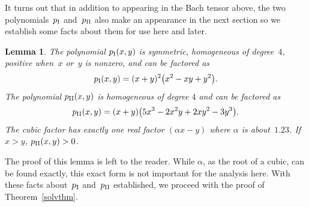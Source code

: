 \documentclass[10pt,a4paper]{amsart}
\numberwithin{equation}{section}
\newtheorem{Lemma}[Theorem]{Lemma}
\begin{document}
It turns out that in addition to appearing in the Bach tensor above, the two polynomials~$p_{\rm I}$ and~$p_{\rm II}$ also make an appearance in the next section so we establish some facts about them for use here and later.

\begin{Lemma}The polynomial $p_{\rm I}(x,y)$ is symmetric, homogeneous of degree~$4$, positive when~$x$ or~$y$ is nonzero, and can be factored as
\[
p_{\rm I}(x, y) = (x+y)^2\big(x^2 - xy + y^2\big).
\]
The polynomial $p_{\rm II}(x,y)$ is homogeneous of degree $4$ and can be factored as
\[
p_{\rm II}(x, y) = (x+y)\big(5x^3 - 2x^2y + 2xy^2 - 3y^3\big).
\]
The cubic factor has exactly one real factor $(\alpha x - y)$ where $\alpha$ is about~$1.23$. If $x > y$, $p_{\rm II}(x, y) > 0$.
\end{Lemma}

The proof of this lemma is left to the reader. While $\alpha$, as the root of a cubic, can be found exactly, this exact form is not important for the analysis here. With these facts about~$p_{\rm I}$ and~$p_{\rm II}$ established, we proceed with the proof of Theorem~\ref{solvthm}.
\end{document}
